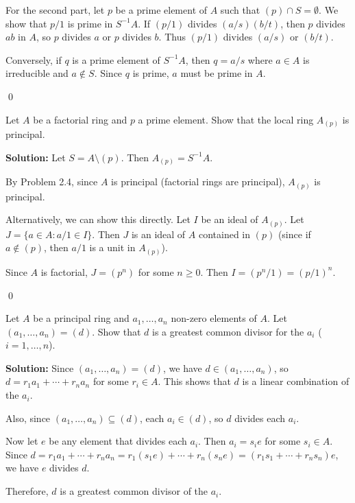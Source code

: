 For the second part, let $p$ be a prime element of $A$ such that $(p) \cap S = \emptyset$. We show that $p/1$ is prime in $S^{-1}A$. If $(p/1)$ divides $(a/s)(b/t)$, then $p$ divides $ab$ in $A$, so $p$ divides $a$ or $p$ divides $b$. Thus $(p/1)$ divides $(a/s)$ or $(b/t)$.

Conversely, if $q$ is a prime element of $S^{-1}A$, then $q = a/s$ where $a \in A$ is irreducible and $a \notin S$. Since $q$ is prime, $a$ must be prime in $A$.


\qed
\begin{problembox}
Let $A$ be a factorial ring and $p$ a prime element. Show that the local ring $A_{(p)}$ is principal.
\end{problembox}

\noindent\textbf{Solution:}
Let $S = A \setminus (p)$. Then $A_{(p)} = S^{-1}A$.

By Problem 2.4, since $A$ is principal (factorial rings are principal), $A_{(p)}$ is principal.

Alternatively, we can show this directly. Let $I$ be an ideal of $A_{(p)}$. Let $J = \{a \in A : a/1 \in I\}$. Then $J$ is an ideal of $A$ contained in $(p)$ (since if $a \notin (p)$, then $a/1$ is a unit in $A_{(p)}$).

Since $A$ is factorial, $J = (p^n)$ for some $n \geq 0$. Then $I = (p^n/1) = (p/1)^n$.


\qed
\begin{problembox}
Let $A$ be a principal ring and $a_1, \ldots, a_n$ non-zero elements of $A$. Let $(a_1, \ldots, a_n) = (d)$. Show that $d$ is a greatest common divisor for the $a_i$ ($i = 1, \ldots, n$).
\end{problembox}

\noindent\textbf{Solution:}
Since $(a_1, \ldots, a_n) = (d)$, we have $d \in (a_1, \ldots, a_n)$, so $d = r_1a_1 + \cdots + r_na_n$ for some $r_i \in A$. This shows that $d$ is a linear combination of the $a_i$.

Also, since $(a_1, \ldots, a_n) \subseteq (d)$, each $a_i \in (d)$, so $d$ divides each $a_i$.

Now let $e$ be any element that divides each $a_i$. Then $a_i = s_i e$ for some $s_i \in A$. Since $d = r_1a_1 + \cdots + r_na_n = r_1(s_1e) + \cdots + r_n(s_ne) = (r_1s_1 + \cdots + r_ns_n)e$, we have $e$ divides $d$.

Therefore, $d$ is a greatest common divisor of the $a_i$.


